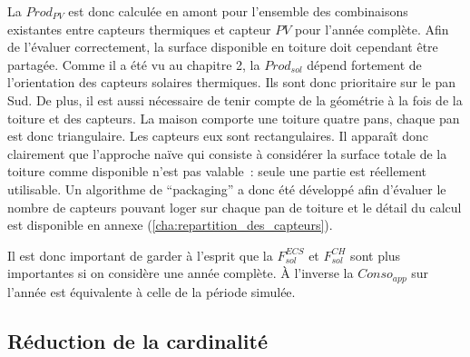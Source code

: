 La $Prod_{PV}$ est donc calculée en amont pour l’ensemble des combinaisons existantes entre
capteurs thermiques et capteur $PV$ pour l’année complète. Afin de l’évaluer correctement,
la surface disponible en toiture doit cependant être partagée. Comme il
a été vu au chapitre 2, la $Prod_{sol}$ dépend fortement de l’orientation des capteurs
solaires thermiques. Ils sont donc prioritaire sur le pan Sud. De plus, il est aussi
nécessaire de tenir compte de la géométrie à la fois de la toiture et des capteurs. La
maison comporte une toiture quatre pans, chaque pan est donc triangulaire. Les capteurs
eux sont rectangulaires. Il apparaît donc clairement que l’approche naïve qui consiste à
considérer la surface totale de la toiture comme disponible n’est pas valable~: seule une
partie est réellement utilisable. Un algorithme de \enquote{packaging} a donc été
développé afin d’évaluer le nombre de capteurs pouvant loger sur chaque pan de toiture et
le détail du calcul est disponible en annexe (\ref{cha:repartition_des_capteurs}).

Il est donc important de garder à l’esprit que la $F_{sol}^{ECS}$ et $F_{sol}^{CH}$
sont plus importantes si on considère une année complète. À l’inverse la $Conso_{app}$
sur l’année est équivalente à celle de la période simulée.





\subsection{Réduction de la cardinalité} %
\label{sec:reduction_de_la_cardinalite}
